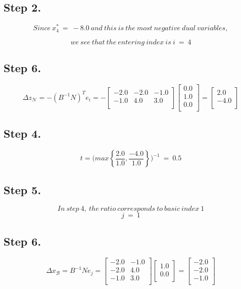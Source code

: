 \documentclass [12pt] {article}
\begin{document}
\subsection{Step 2.}
\[
Since\ x_4^*\ = \ -8.0\ and\ this\ is\ the\ most\ negative\ dual\ variables,
\]

\[
we\ see\ that\ the\ entering\ index\ is\  i\ =\ 4
\]
\subsection{Step 6.}
\[
\Delta z_{\mathcal N}= -( B^{-1} N )^{T}e_i = -\begin{bmatrix}
-2.0 & -2.0 & -1.0 \\ -1.0 & 4.0 & 3.0 \\ 
\end{bmatrix}
\begin{bmatrix}
0.0 \\ 1.0 \\ 0.0 \\ 
\end{bmatrix}
= \begin{bmatrix}
2.0 \\ -4.0 \\ 
\end{bmatrix}
\]
\subsection{Step 4.}
\[
t =\Bigg(
max \left\{\frac{2.0}{1.0},\frac{-4.0}{1.0}\right\}
\Bigg)^{-1}\ =\ 0.5
\]
\subsection{Step 5.}
\[
In\ step\ 4, \ the\ ratio\ corresponds\ to\ basic\ index\ 1
\]
\[
j\ = \ 1
\]
\subsection{Step 6.}
\[
\Delta x_{\mathcal B} = B^{-1} N e_j =
\begin{bmatrix}
-2.0 & -1.0 \\ -2.0 & 4.0 \\ -1.0 & 3.0 \\ 
\end{bmatrix}
\begin{bmatrix}
1.0 \\ 0.0 \\ 
\end{bmatrix}
= \begin{bmatrix}
-2.0 \\ -2.0 \\ -1.0 \\ 
\end{bmatrix}
\]
\end{document}
